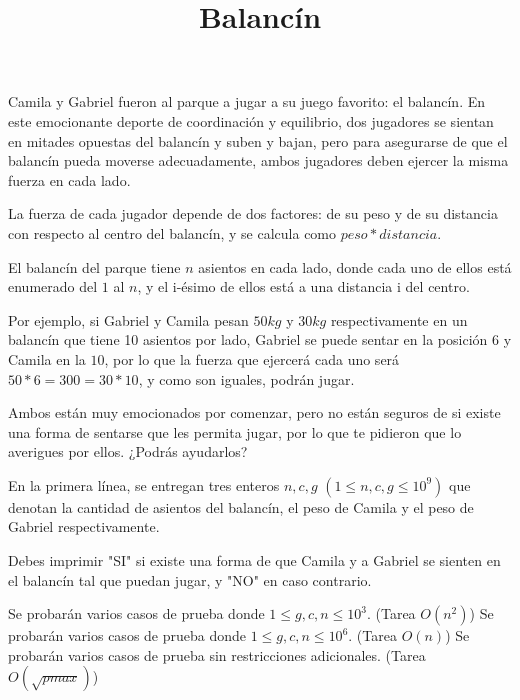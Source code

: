 \documentclass{oci}
\title{Balancín}
\begin{document}
\begin{problemDescription}
	Camila y Gabriel fueron al parque a jugar a su juego favorito: el balancín.
	En este emocionante deporte de coordinación y equilibrio, dos jugadores se sientan en mitades opuestas del balancín y suben y bajan, pero para asegurarse de que el balancín pueda moverse adecuadamente, ambos jugadores deben ejercer la misma fuerza en cada lado.

	La fuerza de cada jugador depende de dos factores: de su peso y de su distancia con respecto al centro del balancín, y se calcula como $peso * distancia$.

	El balancín del parque tiene $n$ asientos en cada lado, donde cada uno de ellos está enumerado del $1$ al $n$, y el i-ésimo de ellos está a una distancia i del centro.

	Por ejemplo, si Gabriel y Camila pesan $50kg$ y $30kg$ respectivamente en un balancín que tiene 10 asientos por lado, Gabriel se puede sentar en la posición $6$ y Camila en la $10$, por lo que la fuerza que ejercerá cada uno será $50*6=300=30*10$, y como son iguales, podrán jugar.

	Ambos están muy emocionados por comenzar, pero no están seguros de si existe una forma de sentarse que les permita jugar, por lo que te pidieron que lo averigues por ellos. ¿Podrás ayudarlos?

\end{problemDescription}

\begin{inputDescription}
	En la primera línea, se entregan tres enteros $n, c, g$ $(1 \leq n, c, g \leq 10^9)$ que denotan la cantidad de asientos del balancín, el peso de Camila y el peso de Gabriel respectivamente.
\end{inputDescription}

\begin{outputDescription}
	Debes imprimir "SI" si existe una forma de que Camila y a Gabriel se sienten en el balancín tal que puedan jugar, y "NO" en caso contrario.
\end{outputDescription}

\begin{scoreDescription}
	 Se probarán varios casos de prueba donde $1 \leq g, c, n \leq 10^3$. (Tarea $O(n^2)$)
	 Se probarán varios casos de prueba donde $1 \leq g, c, n \leq 10^6$. (Tarea $O(n)$)
	 Se probarán varios casos de prueba sin restricciones adicionales. (Tarea $O(\sqrt{pmax})$)
\end{scoreDescription}

\begin{sampleDescription}
\end{sampleDescription}
\end{document}
